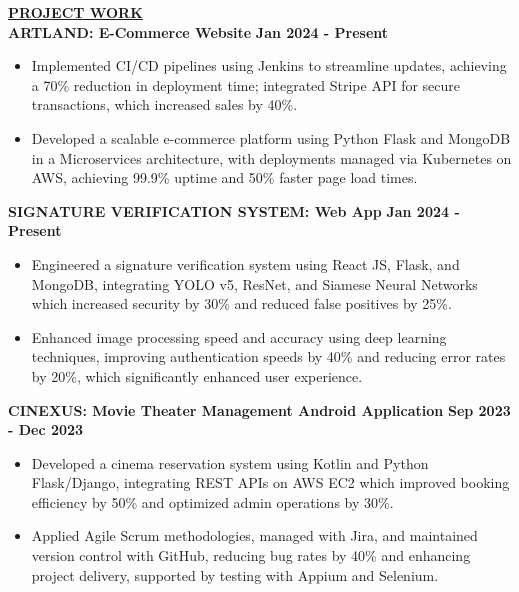 \documentclass{article}
\begin{document}
%
%


\noindent \textbf{\underline{PROJECT WORK}} \\
\noindent \textbf{ARTLAND: E-Commerce Website} \textit \hfill \textbf{Jan 2024 - Present} 
\begin{itemize}[noitemsep,nolistsep,leftmargin=*]
\item {\small Implemented CI/CD pipelines using Jenkins to streamline updates, achieving a 70\% reduction in deployment time; integrated Stripe API for secure transactions, which increased sales by 40\%.}
\item {\small Developed a scalable e-commerce platform using Python Flask and MongoDB in a Microservices architecture, with deployments managed via Kubernetes on AWS, achieving 99.9\% uptime and 50\% faster page load times.}
\end{itemize}
\begin{itemize}
\end{itemize}
\noindent \textbf{SIGNATURE VERIFICATION SYSTEM: Web App} \textit \hfill \textbf{Jan 2024 - Present} 
\begin{itemize}[noitemsep,nolistsep,leftmargin=*]
\item {\small Engineered a signature verification system using React JS, Flask, and MongoDB, integrating YOLO v5, ResNet, and Siamese Neural Networks which increased security by 30\% and reduced false positives by 25\%.}
\item {\small Enhanced image processing speed and accuracy using deep learning techniques, improving authentication speeds by 40\% and reducing error rates by 20\%, which significantly enhanced user experience.}
\end{itemize}
\begin{itemize}
\end{itemize}
\noindent \textbf{CINEXUS: Movie Theater Management Android Application} \textit \hfill \textbf{Sep 2023 - Dec 2023}
\begin{itemize}[noitemsep,nolistsep,leftmargin=*]
\item {\small Developed a cinema reservation system using Kotlin and Python Flask/Django, integrating REST APIs on AWS EC2 which improved booking efficiency by 50\% and optimized admin operations by 30\%.}
\item {\small Applied Agile Scrum methodologies, managed with Jira, and maintained version control with GitHub, reducing bug rates by 40\% and enhancing project delivery, supported by testing with Appium and Selenium.}
\end{itemize}
\end{document}
